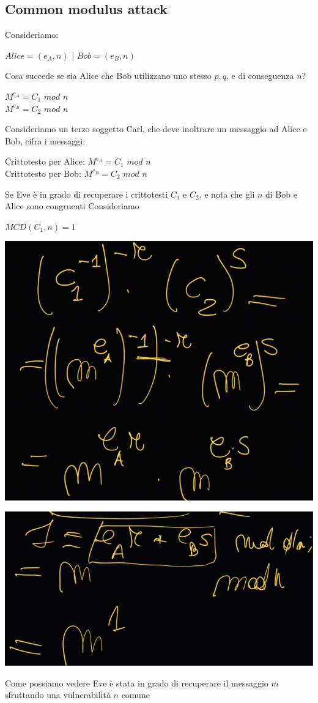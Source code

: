 \documentclass[11pt, oneside]{article}   	%
\begin{document}
\subsection*{Common modulus attack}
Consideriamo:
\begin{center}
$Alice = (e_A, n)$ | $Bob = (e_B, n)$
\end{center}
Cosa succede se sia Alice che Bob utilizzano uno stesso $p,q$, e di conseguenza $n$?
\begin{center}
$M^{e_A} = C_1$ $mod$ $n$\\
$M^{e_B} = C_2$ $mod$ $n$
\end{center}
Consideriamo un terzo soggetto Carl, che deve inoltrare un messaggio ad Alice e Bob, cifra i messaggi:
\begin{center}
Crittotesto per Alice: $M^{e_A} = C_1$ $mod$ $n$\\
Crittotesto per Bob: $M^{e_B} = C_2$ $mod$ $n$
\end{center}
Se Eve è in grado di recuperare i crittotesti $C_1$ e $C_2$, e nota che gli $n$ di Bob e Alice sono congruenti
Consideriamo \begin{center}
$MCD(C_1, n ) = 1$\\
\end{center}
\begin{center}
\includegraphics[scale= 0.7]{exponent}
\end{center}
\begin{center}
\includegraphics[scale= 0.7]{exponent2}
\end{center}
Come possiamo vedere Eve è stata in grado di recuperare il messaggio $m$ sfruttando una vulnerabilità $n$ comune
\end{document}
